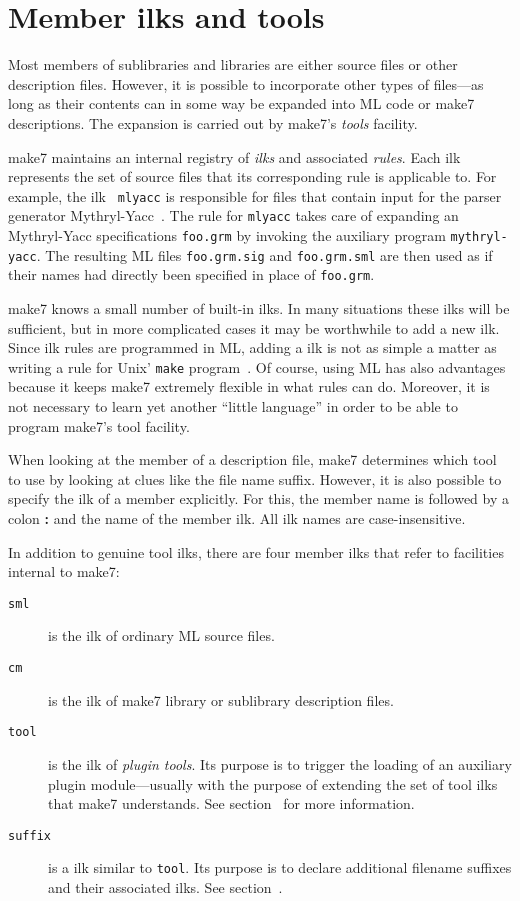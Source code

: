 
\section{Member ilks and tools}
\label{sec:ilks}

Most members of sublibraries and libraries are either source files or
other description files.  However, it is possible to incorporate other
types of files---as long as their contents can in some way be expanded
into ML code or make7 descriptions.  The expansion is carried out by make7's
{\it tools} facility.

make7 maintains an internal registry of {\em ilks} and associated {\em
rules}.  Each ilk represents the set of source files that its
corresponding rule is applicable to.  For example, the ilk {\tt
mlyacc} is responsible for files that contain input for the parser
generator Mythryl-Yacc~\cite{tarditi90:yacc}.  The rule for {\tt mlyacc}
takes care of expanding an Mythryl-Yacc specifications {\tt foo.grm} by
invoking the auxiliary program {\tt mythryl-yacc}.  The resulting ML files
{\tt foo.grm.sig} and {\tt foo.grm.sml} are then used as if their
names had directly been specified in place of {\tt foo.grm}.

make7 knows a small number of built-in ilks.  In many situations these
ilks will be sufficient, but in more complicated cases it may be
worthwhile to add a new ilk.  Since ilk rules are programmed in
ML, adding a ilk is not as simple a matter as writing a rule for
{\sc Unix}' {\tt make} program~\cite{feldman79}.  Of course,
using ML has also advantages because it keeps make7 extremely flexible in
what rules can do.  Moreover, it is not necessary to learn yet another
``little language'' in order to be able to program make7's tool facility.

When looking at the member of a description file, make7 determines which
tool to use by looking at clues like the file name suffix.  However,
it is also possible to specify the ilk of a member explicitly.  For
this, the member name is followed by a colon {\bf :} and the name of
the member ilk.  All ilk names are case-insensitive.

In addition to genuine tool ilks, there are four member ilks
that refer to facilities internal to make7:
\begin{description}
\item[{\tt sml}] is the ilk of ordinary ML source files.
\item[{\tt cm}] is the ilk of make7 library or sublibrary description files.
\item[{\tt tool}] is the ilk of {\em plugin tools}.  Its purpose is
to trigger the loading of an auxiliary plugin module---usually with the
purpose of extending the set of tool ilks that make7 understands.
See section~ for more information.
\item[{\tt suffix}] is a ilk similar to {\tt tool}.  Its purpose is
to declare additional filename suffixes and their associated ilks.
See section~.
\end{description}

